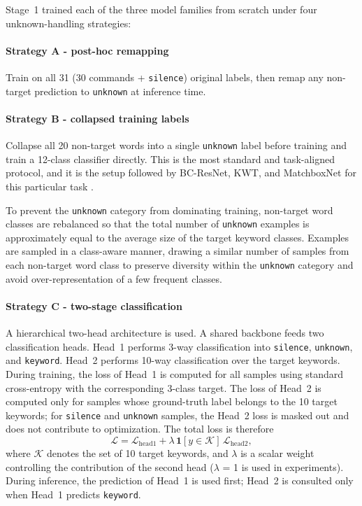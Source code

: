 \documentclass[11pt]{article}
\begin{document}
Stage~1 trained each of the three model families from scratch under four unknown-handling strategies:


\paragraph*{Strategy A - post-hoc remapping}

Train on all 31 (30 commands + \texttt{silence}) original labels, then remap any non-target prediction to \texttt{unknown} at inference time.

\paragraph*{Strategy B - collapsed training labels}

Collapse all 20 non-target words into a single \texttt{unknown} label before training and train a 12-class classifier directly. This is the most standard and task-aligned protocol, and it is the setup followed by BC-ResNet, KWT, and MatchboxNet for this particular task \cite{bcresnet,kwt,matchbox}.

To prevent the \texttt{unknown} category from dominating training, non-target word classes are rebalanced so that the total number of \texttt{unknown} examples is approximately equal to the average size of the target keyword classes. Examples are sampled in a class-aware manner, drawing a similar number of samples from each non-target word class to preserve diversity within the \texttt{unknown} category and avoid over-representation of a few frequent classes.

\paragraph*{Strategy C - two-stage classification}

A hierarchical two-head architecture is used. A shared backbone feeds two classification heads. Head~1 performs 3-way classification into \texttt{silence}, \texttt{unknown}, and \texttt{keyword}. Head~2 performs 10-way classification over the target keywords. During training, the loss of Head~1 is computed for all samples using standard cross-entropy with the corresponding 3-class target. The loss of Head~2 is computed only for samples whose ground-truth label belongs to the 10 target keywords; for \texttt{silence} and \texttt{unknown} samples, the Head~2 loss is masked out and does not contribute to optimization. The total loss is therefore
\[
\mathcal{L} = \mathcal{L}_{\text{head1}} + \lambda \,\mathbf{1}[y \in \mathcal{K}]\, \mathcal{L}_{\text{head2}},
\]
where \(\mathcal{K}\) denotes the set of 10 target keywords, and \(\lambda\) is a scalar weight controlling the contribution of the second head (\(\lambda\) = 1 is used in experiments). During inference, the prediction of Head~1 is used first; Head~2 is consulted only when Head~1 predicts \texttt{keyword}.
\end{document}
